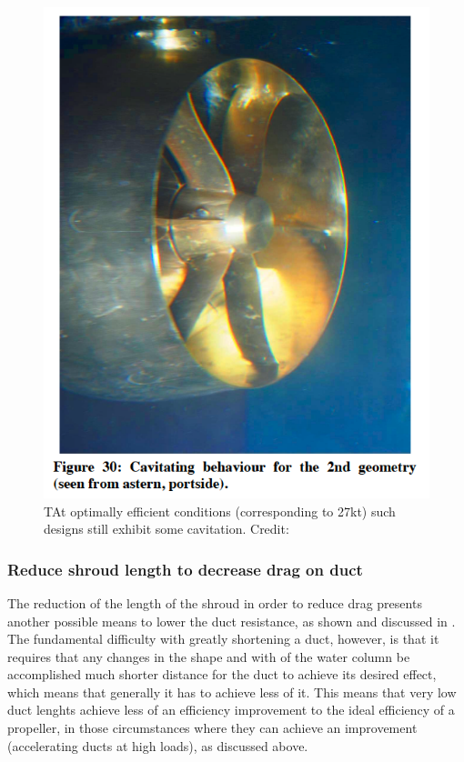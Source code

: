 \documentclass{article}\usepackage[]{graphicx}\usepackage[]{color}
\begin{document}
\begin{figure}
\includegraphics[width=\textwidth]{FineCavitation.png}
\caption{TAt optimally efficient conditions (corresponding to 27kt) such designs still exhibit some cavitation. Credit: \cite{abdel2010}}
\label{fig:FineCavitation.png}
\end{figure}

\subsubsection{Reduce shroud length to decrease drag on duct}
The reduction of the length of the shroud in order to reduce drag presents another possible means to lower the duct resistance, as shown and discussed in \cite[21-25]{oosterveld1970}. The fundamental difficulty with greatly shortening a duct, however, is that it requires that any changes in the shape and with of the water column be accomplished much shorter distance for the duct to achieve its desired effect, which means that generally it has to achieve less of it.  This means that very low duct lenghts achieve less of an efficiency improvement to the ideal efficiency of a propeller, in those circumstances where they can achieve an improvement  (accelerating ducts at high loads), as discussed above.
\end{document}
